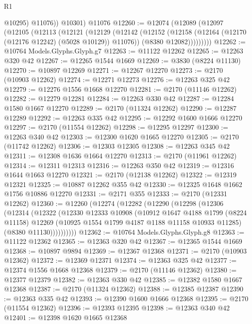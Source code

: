 \begin{lexlean}{R1}
\begin{coremodule}
            @10295)
          @11076))
      @10301)
    @11076
@12260 := @12074
    (@12089
      (@12097
        (@12105
          (@12113
            (@12121
              (@12129
                (@12142
                  (@12152
                    (@12158 (@12164 (@12170 (@12176 @12242) (@5028 @10129)) @11076))
                    (@8380 @12082)))))))))
@12262 := @10764 Models.Glyphs.Glyph.g7
@12263 := @11122 @12262
@12265 := @12263 @320 @42
@12267 := @12265 @1544 @1669
@12269 := @3830 (@8224 @11130)
@12270 := @10897 @12269
@12271 := @12267 @12270
@12273 := @2170 (@10903 @12262)
@12274 := @12271 @12273
@12276 := @12263 @325 @42
@12279 := @12276 @1556 @1668 @12270
@12281 := @2170 (@11146 @12262)
@12282 := @12279 @12281
@12284 := @12263 @330 @42
@12287 := @12284 @1580 @1667 @12270
@12289 := @2170 (@11324 @12262)
@12290 := @12287 @12289
@12292 := @12263 @335 @42
@12295 := @12292 @1600 @1666 @12270
@12297 := @2170 (@11554 @12262)
@12298 := @12295 @12297
@12300 := @12263 @340 @42
@12303 := @12300 @1620 @1665 @12270
@12305 := @2170 (@11742 @12262)
@12306 := @12303 @12305
@12308 := @12263 @345 @42
@12311 := @12308 @1636 @1664 @12270
@12313 := @2170 (@11961 @12262)
@12314 := @12311 @12313
@12316 := @12263 @350 @42
@12319 := @12316 @1644 @1663 @12270
@12321 := @2170 (@12138 @12262)
@12322 := @12319 @12321
@12325 := @10887 @12262 @355 @42
@12330 := @12325 @1648 @1662 @1756 @10886 @12270
@12331 := @2171 @355
@12333 := @2170 (@12331 @12262)
@12360 := @12260
    (@12274
      (@12282
        (@12290
          (@12298
            (@12306
              (@12314
                (@12322
                  (@12330
                    @12333
                    @10908
                    (@10912
                      @1647
                      @4188
                      @1799
                      (@8224 @11158)
                      @12269
                      (@10925 @1554 @1799 @4187 @1188 @11158 @10933 @11285)
                      (@8380 @11130))))))))))
@12362 := @10764 Models.Glyphs.Glyph.g8
@12363 := @11122 @12362
@12365 := @12363 @320 @42
@12367 := @12365 @1544 @1669
@12368 := @10897 @9894
@12369 := @12367 @12368
@12371 := @2170 (@10903 @12362)
@12372 := @12369 @12371
@12374 := @12363 @325 @42
@12377 := @12374 @1556 @1668 @12368
@12379 := @2170 (@11146 @12362)
@12380 := @12377 @12379
@12382 := @12363 @330 @42
@12385 := @12382 @1580 @1667 @12368
@12387 := @2170 (@11324 @12362)
@12388 := @12385 @12387
@12390 := @12363 @335 @42
@12393 := @12390 @1600 @1666 @12368
@12395 := @2170 (@11554 @12362)
@12396 := @12393 @12395
@12398 := @12363 @340 @42
@12401 := @12398 @1620 @1665 @12368

\end{coremodule}
\end{lexlean}
